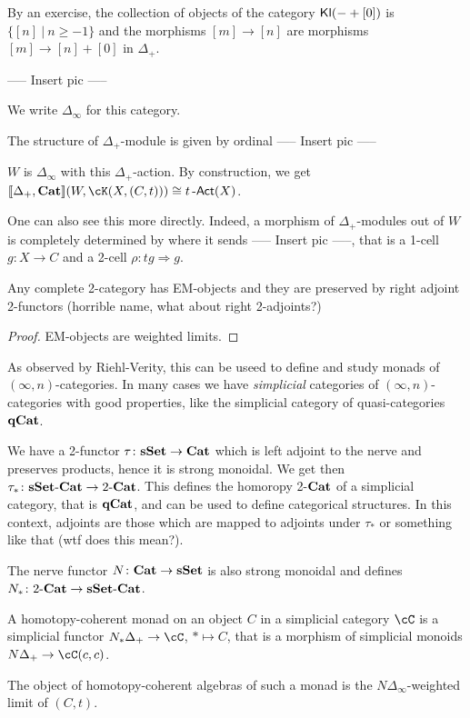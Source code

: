 \documentclass[a4paper,11pt,oneside,openany]{scrbook}
\begin{document}
By an exercise, the collection of objects of the category $\operatorname{\mathsf{Kl}}(-+[0])$ is
$\{[n]\ |\ n\geq -1\}$ and the morphisms $[m]\rightarrow[n]$ are morphisms
$[m]\rightarrow[n]+[0]$ in $\Delta_+$.

----- Insert pic -----

We write $\Delta_\infty$ for this category.

The structure of $\Delta_+$-module is given by ordinal
----- Insert pic -----

$W$ is $\Delta_\infty$ with this $\Delta_+$-action. By construction, we get
$[\![\Delta_+,\Cat]\!](W,\cK(X,(C,t)))\cong t\Act(X)$.

One can also see this more directly. Indeed, a morphism of $\Delta_+$-modules
out of $W$ is completely determined by where it sends ----- Insert pic -----,
that is a 1-cell $g\colon X\rightarrow C$ and a 2-cell $\rho\colon tg\Rightarrow
	g$.

\begin{cor}
	Any complete 2-category has EM-objects and they are preserved by right
	adjoint 2-functors (horrible name, what about right 2-adjoints?)
\end{cor}
\begin{proof}
	EM-objects are weighted limits.
\end{proof}

As observed by Riehl-Verity, this can be useed to define and study monads of
$(\infty,n)$-categories. In many cases we have \emph{simplicial} categories of
$(\infty,n)$-categories with good properties, like the simplicial
category of quasi-categories ${\normalfont\textbf{qCat}}$.

We have a 2-functor $\tau\colon{\normalfont\textbf{sSet}}\rightarrow{\normalfont\textbf{Cat}}$ which is left adjoint to
the nerve and preserves products, hence it is strong monoidal. We get then
$\tau_*\colon{\normalfont\textbf{sSet}}\mbox{-}{\normalfont\textbf{Cat}}\rightarrow 2\mbox{-}{\normalfont\textbf{Cat}}$. This defines the
homoropy 2-${\normalfont\textbf{Cat}}$ of a simplicial category, that is ${\normalfont\textbf{qCat}}$, and can be used to
define categorical structures. In this context, adjoints are those which are
mapped to adjoints under $\tau_*$ or something like that (wtf does this mean?).

The nerve functor $N\colon{\normalfont\textbf{Cat}}\rightarrow{\normalfont\textbf{sSet}}$ is also strong monoidal and
defines $N_*\colon 2\mbox{-}{\normalfont\textbf{Cat}}\rightarrow{\normalfont\textbf{sSet}}\mbox{-}{\normalfont\textbf{Cat}}$.

\begin{defn}
	A homotopy-coherent monad on an object $C$ in a simplicial category $\cC$ is
	a simplicial functor $N_*\Delta_+\rightarrow\cC$, $*\mapsto C$, that
	is a morphism of simplicial monoids $N\Delta_+\rightarrow\cC(c,c)$.

	The object of homotopy-coherent algebras of such a monad is the
	$N\Delta_\infty$-weighted limit of $(C,t)$.
\end{defn}
\end{document}
